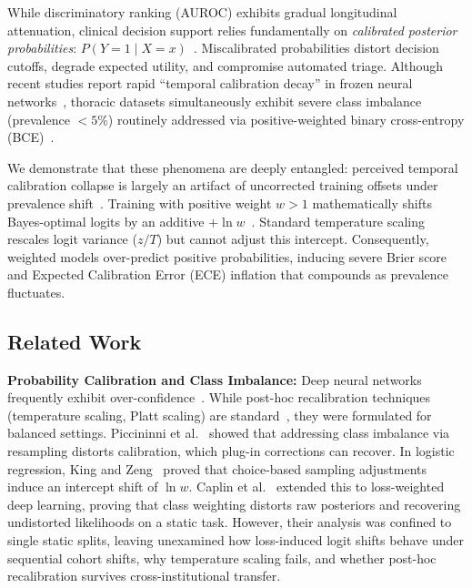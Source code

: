 \documentclass[preprint,12pt]{elsarticle}
\begin{document}
While discriminatory ranking (AUROC) exhibits gradual longitudinal attenuation, clinical decision support relies fundamentally on \textit{calibrated posterior probabilities}: $P(Y = 1 \mid X = x)$~\cite{vancalster2019calibration, steyerberg2010assessing}. Miscalibrated probabilities distort decision cutoffs, degrade expected utility, and compromise automated triage. Although recent studies report rapid ``temporal calibration decay'' in frozen neural networks~\cite{guo2022evaluation, hinson2022multisite}, thoracic datasets simultaneously exhibit severe class imbalance (prevalence $<5\%$) routinely addressed via positive-weighted binary cross-entropy (BCE)~\cite{rajpurkar2017chexnet, buda2018systematic}.

We demonstrate that these phenomena are deeply entangled: perceived temporal calibration collapse is largely an artifact of uncorrected training offsets under prevalence shift~\cite{alexandari2020maximum, davis2020detection}. Training with positive weight $w > 1$ mathematically shifts Bayes-optimal logits by an additive $+\ln w$~\cite{king2001logistic, caplin2022calibrating}. Standard temperature scaling~\cite{guo2017calibration} rescales logit variance ($z / T$) but cannot adjust this intercept. Consequently, weighted models over-predict positive probabilities, inducing severe Brier score and Expected Calibration Error (ECE) inflation that compounds as prevalence fluctuates.

\subsection{Related Work}
\textbf{Probability Calibration and Class Imbalance:} Deep neural networks frequently exhibit over-confidence~\cite{guo2017calibration}. While post-hoc recalibration techniques (temperature scaling, Platt scaling) are standard~\cite{platt1999probabilistic, vancalster2019calibration}, they were formulated for balanced settings. Piccininni et al.~\cite{piccininni2024understanding} showed that addressing class imbalance via resampling distorts calibration, which plug-in corrections can recover. In logistic regression, King and Zeng~\cite{king2001logistic} proved that choice-based sampling adjustments induce an intercept shift of $\ln w$. Caplin et al.~\cite{caplin2022calibrating} extended this to loss-weighted deep learning, proving that class weighting distorts raw posteriors and recovering undistorted likelihoods on a static task. However, their analysis was confined to single static splits, leaving unexamined how loss-induced logit shifts behave under sequential cohort shifts, why temperature scaling fails, and whether post-hoc recalibration survives cross-institutional transfer.
\end{document}
